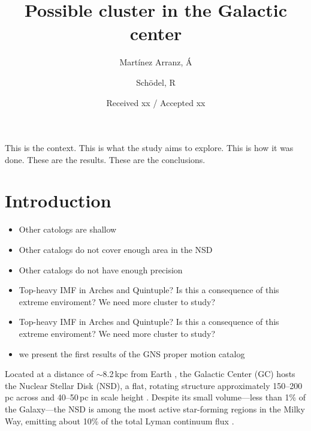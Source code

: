 \documentclass{aa} %
\begin{document}
	
	\title{Possible cluster in the Galactic center}
	
	\author{Martínez Arranz, Á \and Schödel, R}
	
	\date{Received xx / Accepted xx}
	
	\abstract
	{This is the context.}
	{This is what the study aims to explore.}
	{This is how it was done.}
	{These are the results.}
	{These are the conclusions.}
	
	
	\maketitle
	
	\section{Introduction}
	\begin{itemize}
		\item Other catologs are shallow
		\item Other catalogs do not cover enough area in the NSD
		\item Other catalogs do not have enough precision 	
	    \item Top-heavy IMF in Arches and Quintuple? Is this a consequence of this extreme enviroment? We need more cluster to study?
	    \item Top-heavy IMF in Arches and Quintuple? Is this a consequence of this extreme enviroment? We need more cluster to study? 	 	
	    \item we present the first results of the GNS proper motion catalog
	\end{itemize}
	
	Located at a distance of $\sim$8.2\,kpc from Earth \citep{GC_distance_gravity}, the Galactic Center (GC) hosts the Nuclear Stellar Disk (NSD), a flat, rotating structure approximately 150–200\,pc across and 40–50\,pc in scale height \citep{Launhardt_2002, Sch2015, Ban_catalog, Laly_2020, Sormani2022}. Despite its small volume—less than 1\% of the Galaxy—the NSD is among the most active star-forming regions in the Milky Way, emitting about 10\% of the total Lyman continuum flux \citep{Lyman_flux, Lyman_flux_II, Lyman_flux_III}.
	
\end{document}
